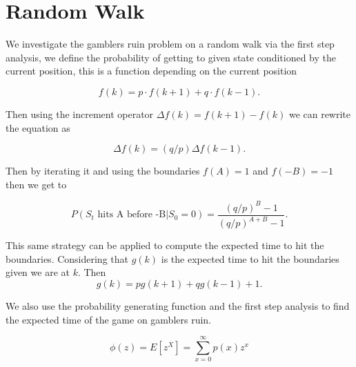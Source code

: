 \section{Random Walk}

We investigate the gamblers ruin problem on a random walk via the first step analysis,
we define the probability of getting to given state conditioned by the current position,
this is a function depending on the current position

\begin{equation*}
    f(k) = p \cdot f(k + 1) + q \cdot f(k - 1).
\end{equation*}

Then using the increment operator $\Delta f(k) = f(k + 1) - f(k)$ we can rewrite the equation as

\begin{equation*}
    \Delta f(k) = (q / p) \Delta f(k - 1).
\end{equation*}

Then by iterating it and using the boundaries $f(A) = 1$ and $f(-B) = -1$ then we get to

\begin{equation*}
    P(S_t \text{ hits A before -B} | S_0 = 0) = \frac{(q / p)^B - 1}{(q / p)^{A + B} - 1}.
\end{equation*}

This same strategy can be applied to compute the expected time to hit the boundaries.
Considering that $g(k)$ is the expected time to hit the boundaries given we are at $k$.
Then
\begin{equation*}
    g(k) = p g(k + 1) + q g(k - 1) + 1.
\end{equation*}

We also use the probability generating function and the first step analysis to find the expected time of the game on gamblers ruin.

\begin{equation*}
    \phi(z) = E[z^X] = \sum_{x=0}^{\infty} p(x) z^x
\end{equation*}
